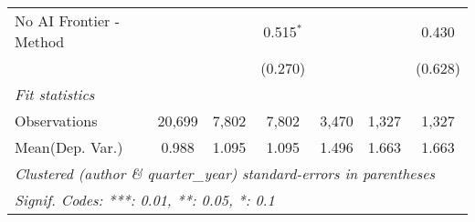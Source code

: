 \begin{tabular}{lcccccc}
   No AI Frontier - Method &              &               & 0.515$^{*}$   &         &               & 0.430\\   
                           &              &               & (0.270)       &         &               & (0.628)\\   
   \midrule
   \emph{Fit statistics}\\
   Observations            & 20,699       & 7,802         & 7,802         & 3,470   & 1,327         & 1,327\\  
Mean(Dep. Var.) & 0.988 & 1.095 & 1.095 & 1.496 & 1.663 & 1.663 \\
   \midrule \midrule
   \multicolumn{7}{l}{\emph{Clustered (author \& quarter\_year) standard-errors in parentheses}}\\
   \multicolumn{7}{l}{\emph{Signif. Codes: ***: 0.01, **: 0.05, *: 0.1}}\\
\end{tabular}
\par\endgroup
